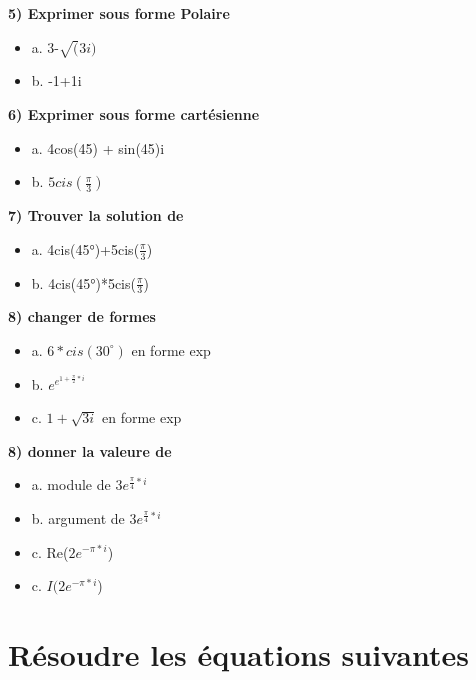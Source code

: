 \vspace{3mm} %
\textbf{5) Exprimer sous forme Polaire}

\begin{itemize}
\item {a. 3-$\sqrt(3i)$}
\item {b. -1+1i}
\end{itemize}

\vspace{3mm} %
\textbf{6) Exprimer sous forme cartésienne}

\begin{itemize}
\item {a. 4cos(45) + sin(45)i}
\item {b. $5cis(\frac{\pi}{3})$}
\end{itemize}

\vspace{3mm} %
\textbf{7) Trouver la solution de}

\begin{itemize}
\item {a. 4cis(45°)+5cis($\frac{\pi}{3}$)}
\item {b. 4cis(45°)*5cis($\frac{\pi}{3}$)}
\end{itemize}

\vspace{3mm} %
\textbf{8) changer de formes}

\begin{itemize}
\item {a. $6*cis(30^{\circ})$ en forme exp}
\item {b. $e^{e^{1 + \frac{\pi}{2}*i}} $}
\item {c. $1 + \sqrt{3i}$ en forme exp}
\end{itemize}

\vspace{3mm} %
\textbf{8) donner la valeure de}

\begin{itemize}
\item {a. module de $3e^{\frac{\pi}{4}*i}$ }
\item {b. argument de $3e^{\frac{\pi}{4}*i}$}
\item {c. Re($2e^{-\pi*i}$) }
\item {c. $I(2e^{-\pi*i}$) }
\end{itemize}


\newpage
\section{Résoudre les équations suivantes}
\vspace{3mm} %

